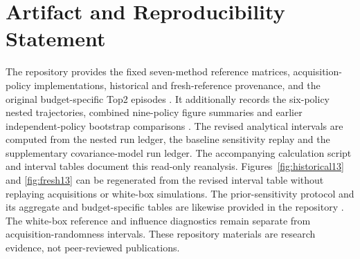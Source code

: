 \documentclass[10pt,a4paper]{article}
\begin{document}
\section*{Artifact and Reproducibility Statement}
The repository provides the fixed seven-method reference matrices, acquisition-policy implementations, historical and fresh-reference provenance, and the original budget-specific Top2 episodes \cite{praiseB1Report,praiseB13,praiseB0001}. It additionally records the six-policy nested trajectories, combined nine-policy figure summaries and earlier independent-policy bootstrap comparisons \cite{praiseNested}. The revised analytical intervals are computed from the nested run ledger, the baseline sensitivity replay and the supplementary covariance-model run ledger. The accompanying calculation script and interval tables document this read-only reanalysis. Figures~\ref{fig:historical13} and \ref{fig:fresh13} can be regenerated from the revised interval table without replaying acquisitions or white-box simulations. The prior-sensitivity protocol and its aggregate and budget-specific tables are likewise provided in the repository \cite{praisePriorSensitivity}. The white-box reference and influence diagnostics remain separate from acquisition-randomness intervals. These repository materials are research evidence, not peer-reviewed publications.
\end{document}
